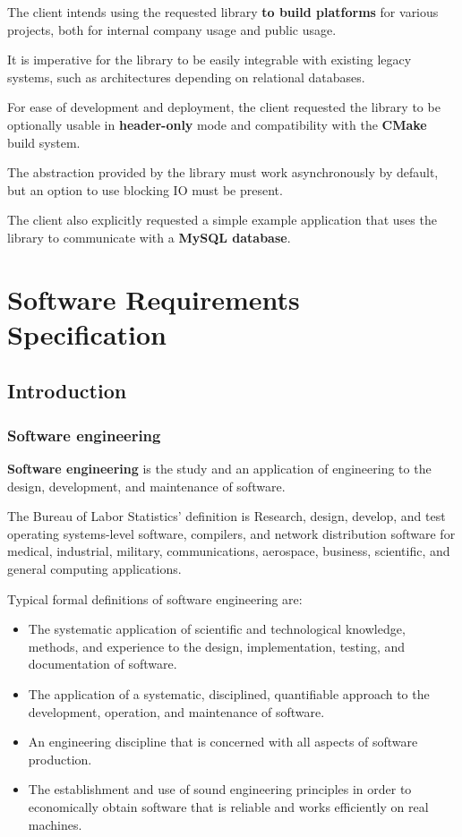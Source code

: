 \documentclass[11pt]{report}
\newcommand{\+}{\discretionary{\mbox{\scriptsize$\hookleftarrow$}}{}{}}
\renewcommand\emph{\textbf}
\begin{document}
        The client intends using the requested library \emph{to build platforms} for various projects, both for internal company usage and public usage.

        It is imperative for the library to be easily integrable with existing legacy systems, such as architectures depending on relational databases.

        For ease of development and deployment, the client requested the library to be optionally usable in \emph{header-only} mode and compatibility with the \emph{CMake} build system.

        The abstraction provided by the library must work asynchronously by default, but an option to use blocking IO must be present.

        The client also explicitly requested a simple example application that uses the library to communicate with a \emph{MySQL database}.


    \chapter{Software Requirements Specification}

        \section{Introduction}

            \subsection{Software engineering}

                \emph{Software engineering} is the study and an application of engineering to the design, development, and maintenance of software.

                The Bureau of Labor Statistics' definition is Research, design, develop, and test operating systems-level software, compilers, and network distribution software for medical, industrial, military, communications, aerospace, business, scientific, and general computing applications.

                Typical formal definitions of software engineering are:

                \begin{itemize}
                    \item The systematic application of scientific and technological knowledge, methods, and experience to the design, implementation, testing, and documentation of software.
                    \item The application of a systematic, disciplined, quantifiable approach to the development, operation, and maintenance of software.
                    \item An engineering discipline that is concerned with all aspects of software production.
                    \item The establishment and use of sound engineering principles in order to economically obtain software that is reliable and works efficiently on real machines.
                \end{itemize}
\end{document}
